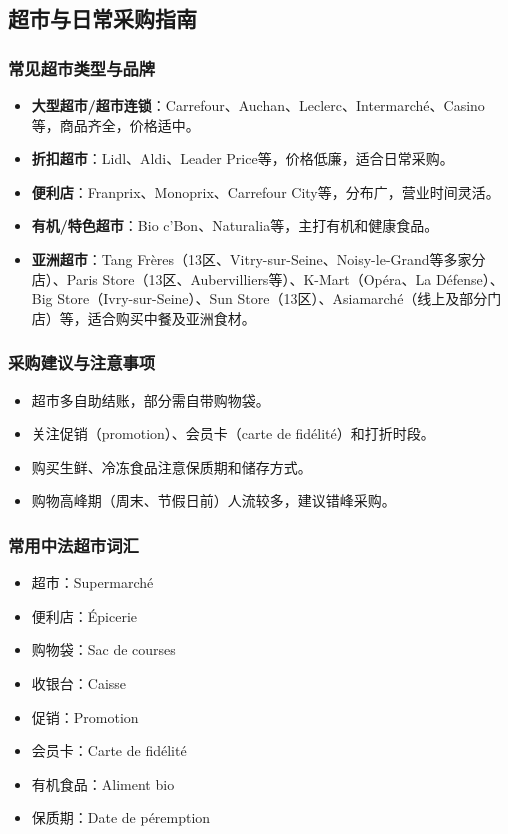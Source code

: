 \subsection{超市与日常采购指南}

\subsubsection{常见超市类型与品牌}
\begin{itemize}
    \item \textbf{大型超市/超市连锁}：Carrefour、Auchan、Leclerc、Intermarché、Casino等，商品齐全，价格适中。
    \item \textbf{折扣超市}：Lidl、Aldi、Leader Price等，价格低廉，适合日常采购。
    \item \textbf{便利店}：Franprix、Monoprix、Carrefour City等，分布广，营业时间灵活。
    \item \textbf{有机/特色超市}：Bio c’Bon、Naturalia等，主打有机和健康食品。
    \item \textbf{亚洲超市}：Tang Frères（13区、Vitry-sur-Seine、Noisy-le-Grand等多家分店）、Paris Store（13区、Aubervilliers等）、K-Mart（Opéra、La Défense）、Big Store（Ivry-sur-Seine）、Sun Store（13区）、Asiamarché（线上及部分门店）等，适合购买中餐及亚洲食材。
\end{itemize}

\subsubsection{采购建议与注意事项}
\begin{itemize}
    \item 超市多自助结账，部分需自带购物袋。
    \item 关注促销（promotion）、会员卡（carte de fidélité）和打折时段。
    \item 购买生鲜、冷冻食品注意保质期和储存方式。
    \item 购物高峰期（周末、节假日前）人流较多，建议错峰采购。
\end{itemize}

\subsubsection{常用中法超市词汇}
\begin{itemize}
    \item 超市：Supermarché
    \item 便利店：Épicerie
    \item 购物袋：Sac de courses
    \item 收银台：Caisse
    \item 促销：Promotion
    \item 会员卡：Carte de fidélité
    \item 有机食品：Aliment bio
    \item 保质期：Date de péremption
\end{itemize}
